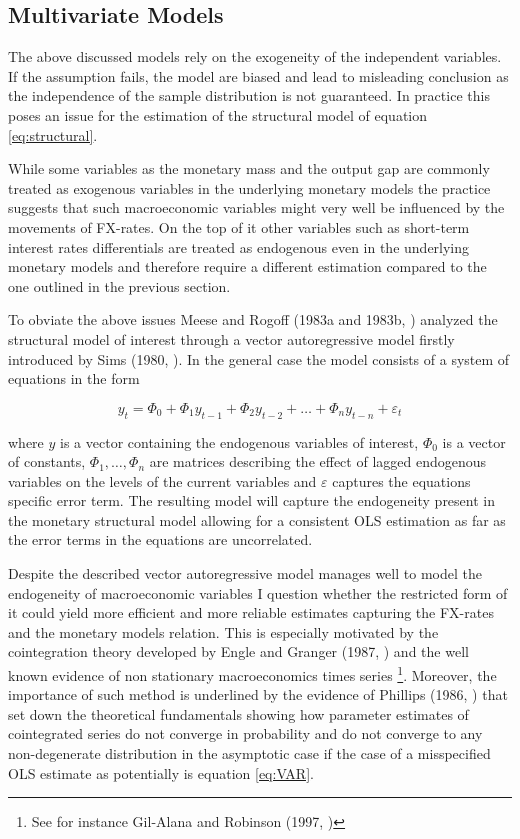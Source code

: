 \subsection{Multivariate Models}
\label{sub:multivariate}
The above discussed models rely on the exogeneity of the independent
variables. If the assumption fails, the model are biased and lead to
misleading conclusion as the independence of the sample distribution
is not guaranteed. In practice this poses an issue for the estimation
of the structural model of equation \ref{eq:structural}.

While some variables as the monetary mass and the output gap are
commonly treated as exogenous variables in the underlying monetary
models the practice suggests that such macroeconomic variables might
very well be influenced by the movements of FX-rates. On the top of it
other variables such as short-term interest rates differentials are
treated as endogenous even in the underlying monetary models and
therefore require a different estimation compared to the one outlined
in the previous section.

To obviate the above issues Meese and Rogoff (1983a and 1983b,
\cite{MeeseRogoffa, MeeseRogoffb}) analyzed the structural model of
interest through a vector autoregressive model firstly introduced by
Sims (1980, \cite{Sims1980}).  In the general case the model consists
of a system of equations in the form

\begin{equation} \label{eq:VAR}
y_{t} =  \Phi_{0}+ \Phi_{1}y_{t-1} + \Phi_{2}y_{t-2} + \dots + \Phi_{n}y_{t-n} + \varepsilon_{t}
\end{equation}

where $y$ is a vector containing the endogenous variables of interest,
$\Phi_0$ is a vector of constants, $\Phi_1, \dots , \Phi_n$ are
matrices describing the effect of lagged endogenous variables on the
levels of the current variables and $\varepsilon$ captures the
equations specific error term.  The resulting model will capture the
endogeneity present in the monetary structural model allowing for a
consistent OLS estimation as far as the error terms in the equations
are uncorrelated.

Despite the described vector autoregressive model manages well to
model the endogeneity of macroeconomic variables I question whether
the restricted form of it could yield more efficient and more reliable
estimates capturing the FX-rates and the monetary models
relation. This is especially motivated by the cointegration theory
developed by Engle and Granger (1987, \cite{EngleGranger}) and the
well known evidence of non stationary macroeconomics times series
\footnote{See for instance Gil-Alana and Robinson (1997,
  \cite{GilAlanaRobinson})}. Moreover, the importance of such method
is underlined by the evidence of Phillips (1986, \cite{Phillips}) that
set down the theoretical fundamentals showing how parameter estimates
of cointegrated series do not converge in probability and do not
converge to any non-degenerate distribution in the asymptotic case if
the case of a misspecified OLS estimate as potentially is equation
\ref{eq:VAR}.

